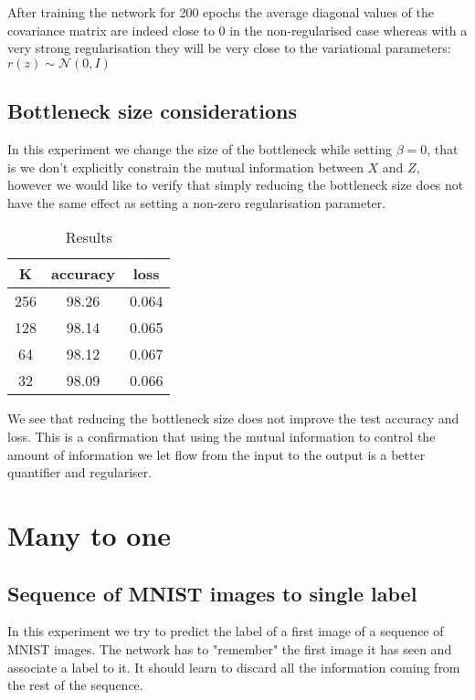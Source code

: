 \documentclass[10pt,oneside,openright]{report}
\begin{document}
After training the network for 200 epochs the average diagonal values of the covariance matrix are indeed close to 0 in the non-regularised case whereas with a very strong regularisation they will be very close to the variational parameters: $r(z) \sim \mathcal{N}(0, I)$

\subsection{Bottleneck size considerations}
In this experiment we change the size of the bottleneck while setting $\beta = 0$, that is we don't explicitly constrain the mutual information between $X$ and $Z$, however we would like to verify that simply reducing the bottleneck size does not have the same effect as setting a non-zero regularisation parameter.

\begin {table}[H]
\begin{center}
\begin{tabular}{ c | c c }
 K & accuracy & loss \\
 \hline
256 & 98.26 & 0.064 \\
128 & 98.14 & 0.065 \\
64 & 98.12& 0.067 \\
32 & 98.09 & 0.066 \\
\end{tabular}
\end{center}
\caption{Results}
\end {table}

We see that reducing the bottleneck size does not improve the test accuracy and loss. This is a confirmation that using the mutual information to control the amount of information we let flow from the input to the output is a better quantifier and regulariser.

\section{Many to one}
\subsection{Sequence of MNIST images to single label}
In this experiment we try to predict the label of a first image of a sequence of MNIST images. The network has to "remember" the first image it has seen and associate a label to it. It should learn to discard all the information coming from the rest of the sequence.
\end{document}
